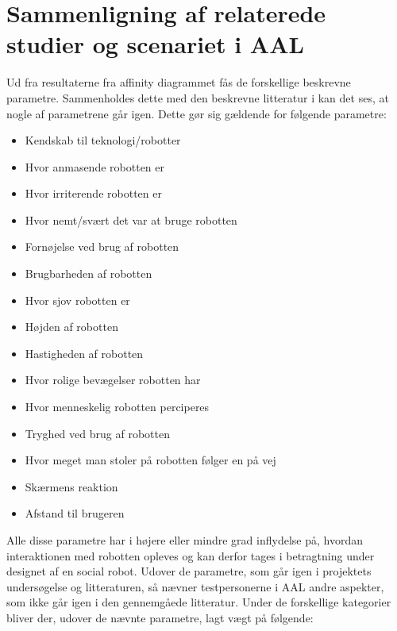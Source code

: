 \section{Sammenligning af relaterede studier og scenariet i AAL}
\label{ParametreTidligereStudier}
%
Ud fra resultaterne fra affinity diagrammet fås de forskellige beskrevne parametre. Sammenholdes dette med den beskrevne litteratur i  kan det ses, at nogle af parametrene går igen. Dette gør sig gældende for følgende parametre:

%
\begin{multicols}{2}
	\begin{itemize}
		\item Kendskab til teknologi/robotter
		\item Hvor anmasende robotten er
		\item Hvor irriterende robotten er
		\item Hvor nemt/svært det var at bruge robotten
		\item Fornøjelse ved brug af robotten
		\item Brugbarheden af robotten
		\item Hvor sjov robotten er
		\item Højden af robotten
		\item Hastigheden af robotten
		\item Hvor rolige bevægelser robotten har
		\item Hvor menneskelig robotten perciperes
		\item Tryghed ved brug af robotten
		\item Hvor meget man stoler på robotten følger en på vej
		\item Skærmens reaktion
		\item Afstand til brugeren
	\end{itemize}
\end{multicols}
\noindent
%
Alle disse parametre har i højere eller mindre grad inflydelse på, hvordan interaktionen med robotten opleves og kan derfor tages i betragtning under designet af en social robot. \blankline
Udover de parametre, som går igen i projektets undersøgelse og litteraturen, så nævner testpersonerne i AAL andre aspekter, som ikke går igen i den gennemgåede litteratur. Under de forskellige kategorier bliver der, udover de nævnte parametre, lagt vægt på følgende:
%
